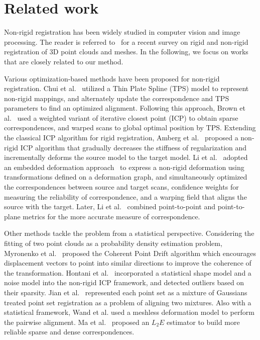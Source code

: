 \section{Related work}
Non-rigid registration has been widely studied in computer vision and image processing. The reader is referred to~\cite{TamCLLLMMSR13} for a recent survey on rigid and non-rigid registration of 3D point clouds and meshes. In the following, we focus on works that are closely related to our method.

Various optimization-based methods have been proposed for non-rigid registration. Chui et al.~\cite{Chui2000A} utilized a Thin Plate Spline (TPS) model to represent non-rigid mappings, and alternately update the correspondence and TPS parameters to find an optimized alignment. Following this approach, Brown et al.~\cite{brown2007Global} used a weighted variant of iterative closest point (ICP) to obtain sparse correspondences, and warped scans to global optimal position by TPS. Extending the classical ICP algorithm for rigid registration,  Amberg et al.~\cite{amberg2007optimal} proposed a non-rigid ICP algorithm that gradually decreases the stiffness of regularization and incrementally deforms the source model to the target model. Li et al.~\cite{li2008global} adopted an embedded deformation approach~\cite{sumner2007embedded} to express a non-rigid deformation using transformations defined on a deformation graph, and simultaneously optimized the correspondences between source and target scans, confidence weights for measuring the reliability of correspondence, and a warping field that aligns the source with the target. Later, Li et al.~\cite{li2009robust} combined point-to-point and point-to-plane metrics for the more accurate measure of correspondence.

Other methods tackle the problem from a statistical perspective.  Considering the fitting of two point clouds as a probability density estimation problem, Myronenko et al.~\cite{Andriy2010Point} proposed the Coherent Point Drift algorithm which encourages displacement vectors to point into similar directions to improve the coherence of the transformation.
Hontani et al.~\cite{hontani2012robust} incorporated a statistical shape model and a noise model into the non-rigid ICP framework, and detected outliers based on their sparsity. Jian et al.~\cite{jian2005robust} represented each point set as a mixture of Gaussians treated point set registration as a problem of aligning two mixtures. Also with a statistical framework, Wand et al.\cite{Wand2009Efficient} used a meshless deformation model to perform the pairwise alignment. Ma et al.~\cite{ma2015robust} proposed an ${L_2}E$ estimator to build more reliable sparse and dense correspondences.

